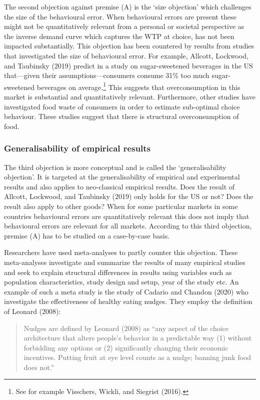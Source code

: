 \documentclass[
]{book}
\begin{document}
The second objection against premise (A) is the `size objection' which challenges the size of the behavioural error. When behavioural errors are present these might not be quantitatively relevant from a personal or societal perspective as the inverse demand curve which captures the WTP at choice, has not been impacted substantially. This objection has been countered by results from studies that investigated the size of behavioural error. For example, Allcott, Lockwood, and Taubinsky (2019) predict in a study on sugar-sweetened beverages in the US that---given their assumptions---consumers consume 31\% too much sugar-sweetened beverages on average.\footnote{See for example Visschers, Wickli, and Siegrist (2016).} This suggests that overconsumption in this market is substantial and quantitatively relevant. Furthermore, other studies have investigated food waste of consumers in order to estimate sub-optimal choice behaviour. These studies suggest that there is structural overconsumption of food.

\hypertarget{generalisability-of-empirical-results}{%
\subsubsection{Generalisability of empirical results}\label{generalisability-of-empirical-results}}

The third objection is more conceptual and is called the `generalisability objection'. It is targeted at the generalisability of empirical and experimental results and also applies to neo-classical empirical results. Does the result of Allcott, Lockwood, and Taubinsky (2019) only holds for the US or not? Does the result also apply to other goods? When for some particular markets in some countries behavioural errors are quantitatively relevant this does not imply that behavioural errors are relevant for all markets. According to this third objection, premise (A) has to be studied on a case-by-case basis.

Researchers have used meta-analyses to partly counter this objection. These meta-analyses investigate and summarize the results of many empirical studies and seek to explain structural differences in results using variables such as population characteristics, study design and setup, year of the study etc. An example of such a meta study is the study of Cadario and Chandon (2020) who investigate the effectiveness of healthy eating nudges. They employ the definition of Leonard (2008):

\begin{quote}
Nudges are defined by Leonard (2008) as ``any aspect of the choice architecture that alters people's behavior in a predictable way (1) without forbidding any options or (2) significantly changing their economic incentives. Putting fruit at eye level counts as a nudge; banning junk food does not.''
\end{quote}
\end{document}
